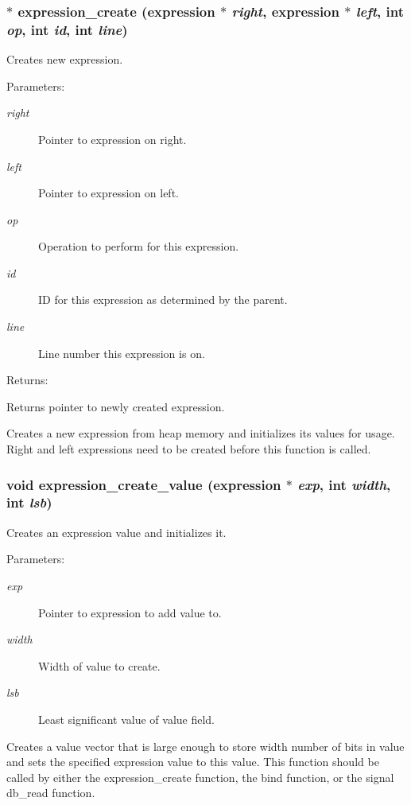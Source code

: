 \subsubsection{$\ast$ expression\_\-create ({\bf expression} $\ast$ {\em right}, {\bf expression} $\ast$ {\em left}, int {\em op}, int {\em id}, int {\em line})}\label{expr_8h_a1}


Creates new expression.

\begin{Desc}
\item[Parameters: ]\par
\begin{description}
\item[{\em 
right}]Pointer to expression on right. \item[{\em 
left}]Pointer to expression on left. \item[{\em 
op}]Operation to perform for this expression. \item[{\em 
id}]ID for this expression as determined by the parent. \item[{\em 
line}]Line number this expression is on.\end{description}
\end{Desc}
\begin{Desc}
\item[Returns: ]\par
Returns pointer to newly created expression.\end{Desc}
Creates a new expression from heap memory and initializes its values for usage. Right and left expressions need to be created before this function is called. 
\subsubsection{\setlength{\rightskip}{0pt plus 5cm}void expression\_\-create\_\-value ({\bf expression} $\ast$ {\em exp}, int {\em width}, int {\em lsb})}\label{expr_8h_a0}


Creates an expression value and initializes it.

\begin{Desc}
\item[Parameters: ]\par
\begin{description}
\item[{\em 
exp}]Pointer to expression to add value to. \item[{\em 
width}]Width of value to create. \item[{\em 
lsb}]Least significant value of value field.\end{description}
\end{Desc}
Creates a value vector that is large enough to store width number of bits in value and sets the specified expression value to this value. This function should be called by either the expression\_\-create function, the bind function, or the signal db\_\-read function. 
